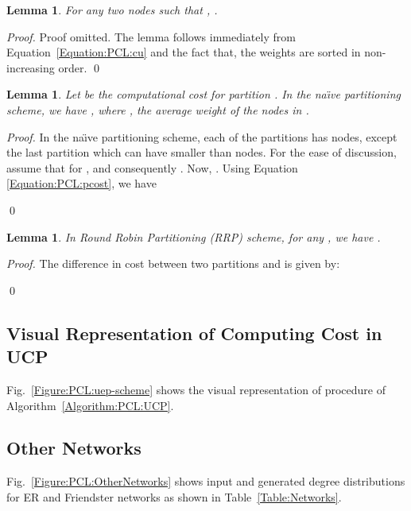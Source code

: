 \documentclass[conference,letterpaper,10pt]{IEEEtran}
\newtheorem{lemma}[theorem]{Lemma}
\newcommand{\Figure}{Fig.\xspace}
\begin{document}
\begin{lemma}
\label{lemma:eugeqev}
For any two nodes  such that , .
\end{lemma}
\begin{proof}
Proof omitted. The lemma follows immediately from Equation~\ref{Equation:PCL:cu} and the fact that, the weights are sorted in non-increasing order. 
\qed
\end{proof}


\begin{lemma}
\label{lemma:unp}
Let  be the computational cost for partition . In the na\"{\i}ve partitioning scheme, we have , where , the average weight of the nodes in .
\end{lemma}

\begin{proof}
In the na\"{\i}ve partitioning scheme, each of the partitions has  nodes, except the last partition which can have smaller than  nodes. For the ease of discussion, assume that for ,  and consequently . Now, .  Using Equation \ref{Equation:PCL:pcost}, we have


\qed
\end{proof}

\begin{lemma}
\label{lemma:rrp}
In Round Robin Partitioning (RRP) scheme, for any , we have .
\end{lemma}

\begin{proof}
The difference in  cost between two partitions  and  is given by:

\qed
\end{proof}

\subsection{Visual Representation of Computing Cost in UCP}
\label{Figure:Schematic Diagram}

\Figure~\ref{Figure:PCL:uep-scheme} shows the visual representation of  procedure of Algorithm~\ref{Algorithm:PCL:UCP}.



\subsection{Other Networks}
\label{Section:OtherNetworks}

\Figure~\ref{Figure:PCL:OtherNetworks} shows input and generated degree distributions for ER and Friendster networks as shown in Table~\ref{Table:Networks}.
\end{document}
